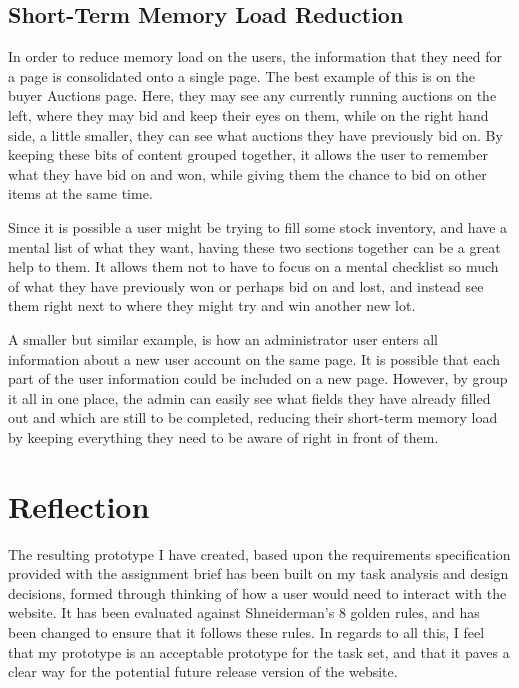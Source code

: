 \documentclass{article}
\begin{document}
\subsection{Short-Term Memory Load Reduction}
In order to reduce memory load on the users, the information that  they need for a page is consolidated onto a single page. The best example of this is on the buyer Auctions page. Here, they may see any currently running auctions on the left, where they may bid and keep their eyes on them, while on the right hand side, a little smaller, they can see what auctions they have previously bid on. By keeping these bits of content grouped together, it allows the user to remember what they have bid on and won, while giving them the chance to bid on other items at the same time.

Since it is possible a user might be trying to fill some stock inventory, and have a mental list of what they want, having these two sections together can be a great help to them. It allows them not to have to focus on a mental checklist so much of what they have previously won or perhaps bid on and lost, and instead see them right next to where they might try and win another new lot.

A smaller but similar example, is how an administrator user enters all information about a new user account on the same page. It is possible that each part of the user information could be included on a new page. However, by group it all in one place, the admin can easily see what fields they have already filled out and which are still to be completed, reducing their short-term memory load by keeping everything they need to be aware of right in front of them.


\section{Reflection}
The resulting prototype I have created, based upon the requirements specification provided with the assignment brief has been built on my task analysis and design decisions, formed through thinking of how a user would need to interact with the website. It has been evaluated against Shneiderman's 8 golden rules, and has been changed to ensure that it follows these rules. In regards to all this, I feel that my prototype is an acceptable prototype for the task set, and that it paves a clear way for the potential future release version of the website.
\end{document}
